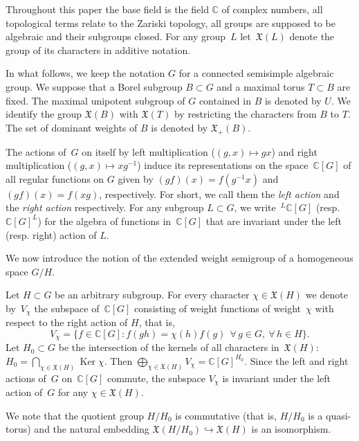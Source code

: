 \documentclass[12pt]{amsart}
\theoremstyle{definition}
\theoremstyle{remark}
\begin{document}
{}{}
\label{ssec1.2} Throughout this paper the base field is the field
$\mathbb C$ of complex numbers, all topological terms relate to the
Zariski topology, all groups are supposed to be algebraic and their
subgroups closed. For any group~$L$ let~$\mathfrak{X}(L)$ denote the
group of its characters in additive notation.

In what follows, we keep the notation $G$ for a connected semisimple
algebraic group. We suppose that a Borel subgroup $B\subset G$ and a
maximal torus $T\subset B$ are fixed. The maximal unipotent subgroup
of $G$ contained in $B$ is denoted by $U$. We identify the group
$\mathfrak X(B)$ with $\mathfrak X(T)$ by restricting the characters
from $B$ to $T$. The set of dominant weights of $B$ is denoted by
$\mathfrak X_+(B)$.

The actions of~$G$ on itself by left multiplication ($(g,x)\mapsto
gx$) and right multiplication ($(g,x)\mapsto xg^{-1}$) induce its
representations on the space~$\mathbb{C}[G]$ of all regular
functions on $G$ given by $(gf)(x)=f(g^{-1}x)$ and $(gf)(x)=f(xg)$,
respectively. For short, we call them the \textit{left action} and
the \textit{right action} respectively. For any subgroup $L\subset
G$, we write~${}^L\mathbb{C}[G]$ (resp. $\mathbb{C}[G]^L$) for the
algebra of functions in~$\mathbb{C}[G]$ that are invariant under the
left (resp. right) action of $L$.

We now introduce the notion of the extended weight semigroup of a
homogeneous space $G/H$.

Let $H\subset G$ be an arbitrary subgroup. For every character
$\chi\in\mathfrak{X}(H)$ we denote by~$V_{\chi}$ the subspace
of~$\mathbb{C}[G]$ consisting of weight functions of weight~$\chi$
with respect to the right action of $H$, that is,
$$
V_{\chi}=\bigl\{f\in \mathbb{C}[G]\colon f(gh)=\chi(h)f(g)\ \
\forall\,g\in G, \ \forall\,h\in H\bigr\}.
$$
Let $H_0\subset G$ be the intersection of the kernels of all
characters in~$\mathfrak X(H)$: $H_0=\bigcap
\limits_{\chi\in\mathfrak{X}(H)}{\operatorname{Ker}}\chi$. Then $\bigoplus
\limits_{\chi\in\mathfrak{X}(H)}V_\chi=\mathbb{C}[G]^{H_0}$. Since
the left and right actions of~$G$ on~$\mathbb{C}[G]$ commute, the
subspace $V_\chi$ is invariant under the left action of~$G$ for any
$\chi\in\mathfrak{X}(H)$.

We note that the quotient group $H/H_0$ is commutative (that is,
$H/H_0$ is a quasi-torus) and the natural embedding
$\mathfrak{X}(H/H_0)\hookrightarrow\mathfrak{X}(H)$ is an
isomorphism.
\end{document}
